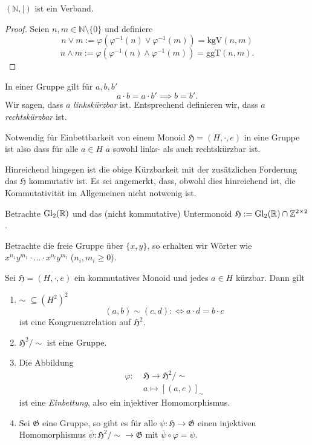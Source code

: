 \begin{corollary}
    $(\mathbb{N}, \mid)$ ist ein Verband.
\end{corollary}

\begin{proof}
    Seien $n,m \in \mathbb{N} \setminus \{0\}$ und definiere
    $$ n \vee m := \varphi(\varphi^{-1}(n) \vee \varphi^{-1}(m)) = \textrm{kgV}(n,m) $$
    $$ n \wedge m := \varphi(\varphi^{-1}(n) \wedge \varphi^{-1}(m)) = \textrm{ggT}(n,m). $$
\end{proof}

\begin{remark}
    In einer Gruppe gilt für $a, b, b'$
    $$ a \cdot b = a \cdot b' \implies b = b'. $$
    Wir sagen, dass $a$ \emph{linkskürzbar} ist. Entsprechend definieren wir, dass $a$ \emph{rechtskürzbar} ist.

    Notwendig für Einbettbarkeit von einem Monoid $\mathfrak{H} = (H, \cdot, e)$ in eine Gruppe ist also dass für alle $a \in H$ $a$ sowohl links- als auch rechtskürzbar ist.

    Hinreichend hingegen ist die obige Kürzbarkeit mit der zusätzlichen Forderung das $\mathfrak{H}$ kommutativ ist. Es sei angemerkt, dass, obwohl dies hinreichend ist, die Kommutativität im Allgemeinen nicht notwenig ist.
\end{remark}

\begin{example}
    Betrachte $\operatorname{Gl}_2(\mathbb{R})$ und das (nicht kommutative) Untermonoid $\mathfrak{H} := \operatorname{Gl}_2(\mathbb{R}) \cap \mathbb{Z}^{2 \times 2}$.

    Betrachte die freie Gruppe über $\{x,y\}$, so erhalten wir Wörter wie $x^{n_1} y^{m_1} \cdot ... \cdot x^{n_l} y^{m_l}$ ($n_i, m_i \geq 0$).
\end{example}

\begin{theorem}
    Sei $\mathfrak{H} = (H, \cdot, e)$ ein kommutatives Monoid und jedes $a \in H$ kürzbar. Dann gilt
    \begin{enumerate}
        \item $\sim\; \subseteq (H^2)^2$
        $$ (a,b) \sim (c,d) :\Leftrightarrow a \cdot d = b \cdot c $$
        ist eine Kongruenzrelation auf $\mathfrak{H}^2$.
        \item $\mathfrak{H}^2 / \sim$ ist eine Gruppe.
        \item Die Abbildung
        \begin{align*}
            \varphi :\;& \mathfrak{H} \to \mathfrak{H}^2 / \sim \\
            & a \mapsto [(a,e)]_\sim
        \end{align*}
        ist eine \emph{Einbettung}, also ein injektiver Homomorphismus.
        \item Sei $\mathfrak{G}$ eine Gruppe, so gibt es für alle $\psi : \mathfrak{H} \to \mathfrak{G}$ einen injektiven Homomorphismus $\overline{\psi} : \mathfrak{H}^2 / \sim \to \mathfrak{G}$ mit $\overline{\psi} \circ \varphi = \psi$.
    \end{enumerate}
\end{theorem}

